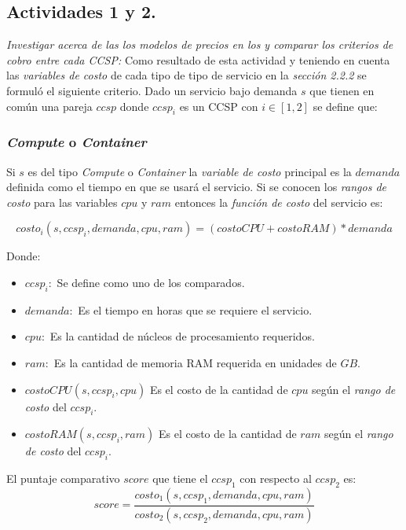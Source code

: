 \subsection{Actividades 1 y 2.}
\emph{Investigar acerca de las los modelos de precios en los  y comparar los criterios de cobro entre cada \acrshort{CCSP}:}
\newline
\newline
Como resultado de esta actividad y teniendo en cuenta las \emph{variables de costo} de cada tipo de tipo de servicio en la \emph{sección 2.2.2} se formuló el siguiente criterio.
\newline
\newline
Dado un servicio bajo demanda \(s\) que tienen en común una pareja $ccsp$ donde $ccsp_i$ es un \acrshort{CCSP} con $i \in [1,2]$ se define que:

\subsubsection{\emph{Compute} o \emph{Container}}
Si $s$ es del tipo \emph{Compute} o \emph{Container} la \emph{variable de costo} principal es la $demanda$ definida como el tiempo en que se usará el servicio. Si se conocen los \emph{rangos de costo} para las variables $cpu$ y $ram$ entonces la \emph{función de costo} del servicio es:

\[ costo_i(s,ccsp_i, demanda, cpu, ram) = (costoCPU +costoRAM)*demanda \]

Donde:
\begin{itemize}
    \item $ccsp_i:$ Se define como uno de los  comparados.
    \item $demanda:$ Es el tiempo en horas que se requiere el servicio.
    \item $cpu:$ Es la cantidad de núcleos de procesamiento requeridos.
    \item $ram:$ Es la cantidad de memoria RAM requerida en unidades de $GB$.
    \item $costoCPU(s,ccsp_i, cpu)$ Es el costo de la cantidad de $cpu$ según el \emph{rango de costo} del $ccsp_i$.
    \item $costoRAM(s,ccsp_i, ram)$ Es el costo de la cantidad de $ram$ según el \emph{rango de costo} del $ccsp_i$.
\end{itemize}

El puntaje comparativo $score$ que tiene el $ccsp_1$ con respecto al $ccsp_2$ es:
\[ score = \frac{costo_1(s,ccsp_1,demanda,cpu,ram)}{costo_2(s,ccsp_2,demanda,cpu,ram)} \]

